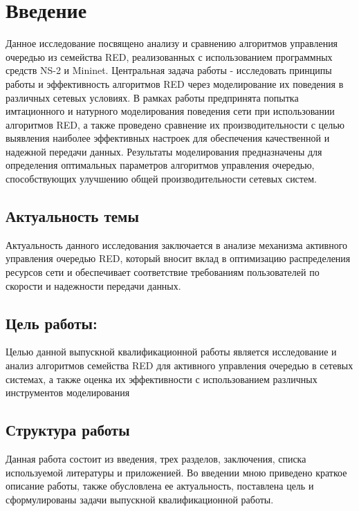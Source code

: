 \chapter*{Введение}

Данное исследование посвящено анализу и сравнению алгоритмов управления очередью из семейства RED, реализованных с использованием программных средств NS-2 и Mininet. Центральная задача работы - исследовать принципы работы и эффективность алгоритмов RED через моделирование их поведения в различных сетевых условиях. В рамках работы предпринята попытка имтационного и натурного моделирования поведения сети при использовании алгоритмов RED, а также проведено сравнение их производительности с целью выявления наиболее эффективных настроек для обеспечения качественной и надежной передачи данных. Результаты моделирования предназначены для определения оптимальных параметров алгоритмов управления очередью, способствующих улучшению общей производительности сетевых систем.

\section*{Актуальность темы}

Актуальность данного исследования заключается в анализе механизма активного управления очередью RED, который вносит вклад в оптимизацию распределения ресурсов сети и обеспечивает соответствие требованиям пользователей по скорости и надежности передачи данных.

\section*{Цель работы:}

Целью данной выпускной квалификационной работы является исследование и анализ алгоритмов семейства RED для активного управления очередью в сетевых системах, а также оценка их эффективности с использованием различных инструментов моделирования

\section*{Структура работы}
Данная работа состоит из введения, трех разделов, заключения, списка используемой литературы и приложенией. Во введении мною приведено краткое описание работы, также обусловлена ее актуальность, поставлена цель и сформулированы задачи выпускной квалификационной работы.

